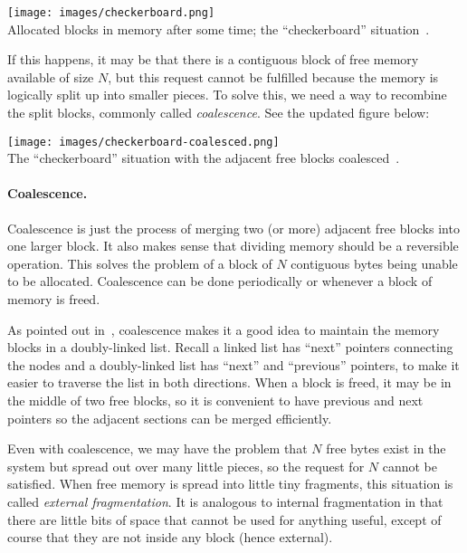 \begin{center}
\texttt{[image: images/checkerboard.png]}\\
Allocated blocks in memory after some time; the ``checkerboard'' situation~\cite{mte241}.
\end{center}

If this happens, it may be that there is a contiguous block of free memory available of size $N$, but this request cannot be fulfilled because the memory is logically split up into smaller pieces. To solve this, we need a way to recombine the split blocks, commonly called \textit{coalescence}. See the updated figure below:

\begin{center}
\texttt{[image: images/checkerboard-coalesced.png]}\\
The ``checkerboard'' situation with the adjacent free blocks coalesced~\cite{mte241}.
\end{center}

\paragraph{Coalescence.} Coalescence is just the process of merging two (or more) adjacent free blocks into one larger block. It also makes sense that dividing memory should be a reversible operation. This solves the problem of a block of $N$ contiguous bytes being unable to be allocated. Coalescence can be done periodically or whenever a block of memory is freed.

As pointed out in~\cite{mte241}, coalescence makes it a good idea to maintain the memory blocks in a doubly-linked list. Recall a linked list has ``next'' pointers connecting the nodes and a doubly-linked list has ``next'' and ``previous'' pointers, to make it easier to traverse the list in both directions. When a block is freed, it may be in the middle of two free blocks, so it is convenient to have previous and next pointers so the adjacent sections can be merged efficiently.

Even with coalescence, we may have the problem that $N$ free bytes exist in the system but spread out over many little pieces, so the request for $N$ cannot be satisfied. When free memory is spread into little tiny fragments, this situation is called \textit{external fragmentation}. It is analogous to internal fragmentation in that there are little bits of space that cannot be used for anything useful, except of course that they are not inside any block (hence external).

